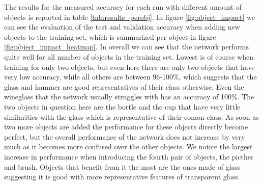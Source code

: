 The results for the measured accuracy for each run with different amount of objects is reported in table \ref{tab:results_perobj}. In figure \ref{fig:object_impact} we can see the evaluation of the test and validation accuracy when adding new objects to the training set, which is summarized per object in figure \ref{fig:object_impact_heatmap}. In overall we can see that the network performs quite well for all number of objects in the training set. Lowest is of course when training for only two objects, but even here there are only two objects that have very low accuracy, while all others are between 96-100\%, which suggests that the glass and hammer are good representatives of their class otherwise. Even the wineglass that the network usually struggles with has an accuracy of 100\%. The two objects in question here are the bottle and the cup that have very little similarities with the glass which is representative of their comon class. As soon as two more objects are added the performance for these objects directly become perfect, but the overall performance of the network does not increase by very much as it becomes more confused over the other objects. We notice the largest increase in performance when introducing the fourth pair of objects, the picther and brush. Objects that benefit from it the most are the ones made of glass suggesting it is good with more representative features of transparent glass.
